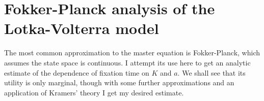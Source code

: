 \section{Fokker-Planck analysis of the Lotka-Volterra model} \label{FPsection}
The most common approximation to the master equation is Fokker-Planck, which assumes the state space is continuous. 
I attempt its use here to get an analytic estimate of the dependence of fixation time on $K$ and $a$. 
We shall see that its utility is only marginal, though with some further approximations and an application of Kramers' theory I get my desired estimate. 

